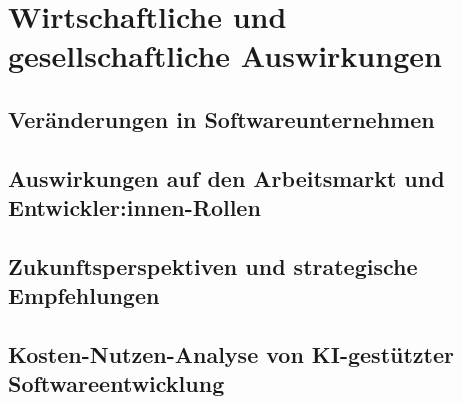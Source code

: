 \chapter{Wirtschaftliche und gesellschaftliche Auswirkungen}
\label{chap:wirtschaftliche_und_gesellschaftliche_auswirkungen}

\section{Veränderungen in Softwareunternehmen}


\section{Auswirkungen auf den Arbeitsmarkt und Entwickler:innen-Rollen}


\section{Zukunftsperspektiven und strategische Empfehlungen}


\section{Kosten-Nutzen-Analyse von KI-gestützter Softwareentwicklung}
